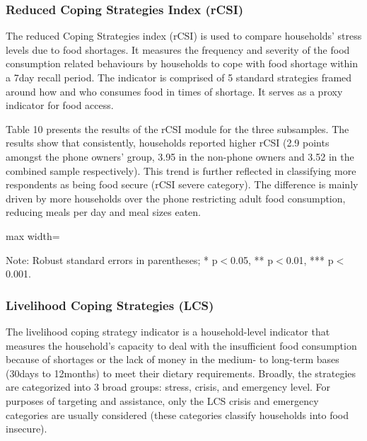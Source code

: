 \documentclass[11pt,harvard]{article}
\begin{document}
\pagebreak	
	
	
\subsubsection{Reduced Coping Strategies Index (rCSI)}

The reduced Coping Strategies index (rCSI) is used to compare households’ stress levels due to food shortages. It measures the frequency and severity of the food consumption related behaviours by households to cope with food shortage within a 7day recall period. The indicator is comprised of 5 standard strategies framed around how and who consumes food in times of shortage. It serves as a proxy indicator for food access.

Table 10 presents the results of the rCSI module for the three subsamples. The results show that consistently, households reported higher rCSI (2.9 points amongst the phone owners' group, 3.95 in the non-phone owners and 3.52 in the combined sample respectively). This trend is further reflected in classifying more respondents as being food secure (rCSI severe category). The difference is mainly driven by more households over the phone restricting adult food consumption, reducing meals per day and meal sizes eaten.
	
	
	\begin{table}[htbp]
		\centering
		\begin{adjustbox}{max width=\textwidth}
			\begin{threeparttable}
				\caption{Impact of Survey Modality on Reduced Coping Strategy Index Classification}
				\scriptsize
				 
				\label{tab:rCSI_Modality_CAR}
				\begin{tablenotes}
					\item Note: Robust standard errors in parentheses; * p$<$0.05, ** p$<$0.01, *** p$<$0.001.
				\end{tablenotes}
			\end{threeparttable}
		\end{adjustbox}
	\end{table}

	
\subsubsection{Livelihood Coping Strategies (LCS)}

The livelihood coping strategy indicator is a household-level indicator that measures the household's capacity to deal with the insufficient food consumption because of shortages or the lack of money in the medium- to long-term bases (30days to 12months) to meet their dietary requirements. Broadly, the strategies are categorized into 3 broad groups: stress, crisis, and emergency level. For purposes of targeting and assistance, only the LCS crisis and emergency categories are usually considered (these categories classify households into food insecure).
	
\end{document}
